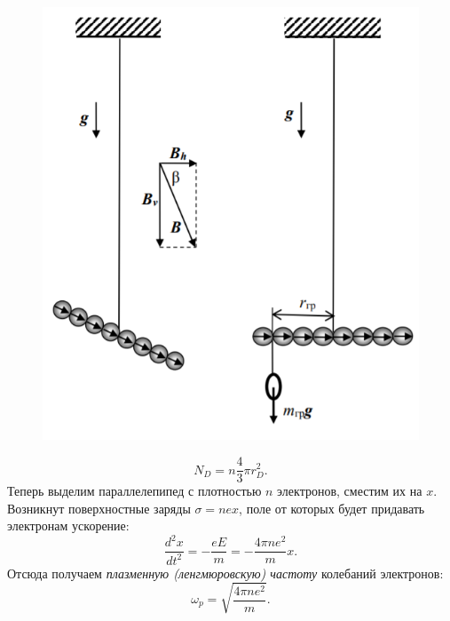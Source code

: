 \documentclass[a4paper,12pt]{article}
\begin{document}
\begin{figure}
\includegraphics[scale=0.5]{2.png}
\end{figure}  
\begin{equation}
N_D = n\dfrac{4}{3}\pi r_D^2.
\end{equation}
Теперь выделим параллелепипед с плотностью $n$ электронов, сместим их на $x$. Возникнут поверхностные заряды $\sigma = nex$, поле от которых будет придавать электронам ускорение:
$$
\dfrac{d^2x}{dt^2}=-\dfrac{eE}{m}=-\dfrac{4\pi n e^2}{m}x.
$$ 
Отсюда получаем \textit{плазменную (ленгмюровскую) частоту} колебаний электронов:
\begin{equation}
\omega_p = \sqrt{\dfrac{4\pi ne^2}{m}}.
\end{equation}
\end{document}
